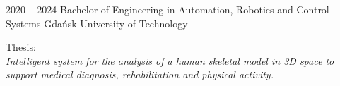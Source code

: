 \documentclass[9pt]{./src/packages/Developer_CV/developercv}
\begin{document}

\begin{entrylist}
    \entry
        {2020 -- 2024}
        {Bachelor of Engineering in Automation, Robotics and Control Systems}
        {Gdańsk University of Technology}
        {
        \raggedright
        Thesis:\\
        \textit{Intelligent system for the analysis of a human skeletal model
        in 3D space to support medical diagnosis, rehabilitation and physical
        activity.}
        }
\end{entrylist}


\end{document}
